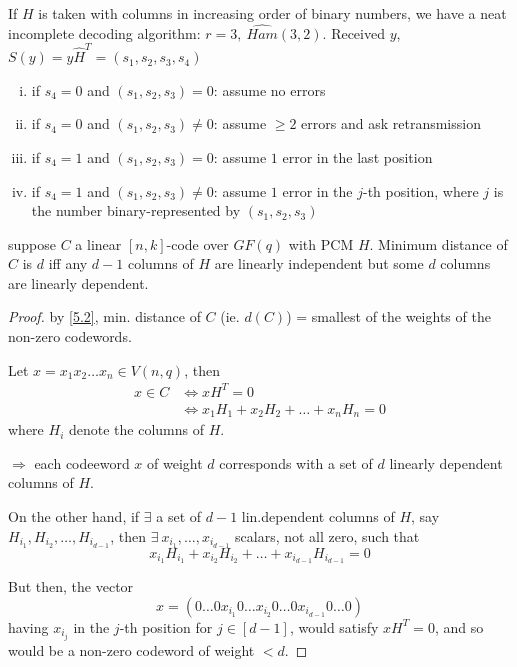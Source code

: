 \documentclass{article}
\theoremstyle{definition}
\newenvironment{thm}[1]
{\renewcommand\theinnerthm{#1}\innerthm}
{\endinnerthm}
\newenvironment{eg}[1]
{\renewcommand\theinnereg{#1}\innereg}
{\endinnereg}
\newcommand{\Vnq}{V(n, q)}
\begin{document}
If $H$ is taken with columns in increasing order of binary numbers, we have a neat incomplete decoding algorithm:
\begin{eg}{8.3}
  $r=3,~ \hat{Ham}(3,2)$. Received $y$, $S(y)=y \hat{H}^T = (s_1, s_2, s_3, s_4)$
  \begin{enumerate}[i.]
    \item if $s_4=0$ and $(s_1,s_2,s_3)=0$: assume no errors
    \item if $s_4=0$ and $(s_1,s_2,s_3) \neq 0$: assume $\geq 2$ errors and ask retransmission
    \item if $s_4=1$ and $(s_1,s_2,s_3)=0$: assume $1$ error in the last position
    \item if $s_4=1$ and $(s_1,s_2,s_3) \neq 0$: assume $1$ error in the $j$-th position, where $j$ is the number binary-represented by $(s_1,s_2,s_3)$
  \end{enumerate}
\end{eg}

\vspace{1.0cm}

\begin{thm}{8.4} \label{8.4}
  suppose $C$ a linear $[n,k]$-code over $GF(q)$ with PCM $H$. Minimum distance of $C$ is $d$ iff any $d-1$ columns of $H$ are linearly independent but some $d$ columns are linearly dependent.
\end{thm}
\begin{proof}
  by \ref{5.2}, min. distance of $C$ (ie. $d(C)$) = smallest of the weights of the non-zero codewords.

  Let $x=x_1 x_2 \ldots x_n \in \Vnq$, then
  \begin{align*}
    x \in C &\Longleftrightarrow xH^T=0\\
            &\Longleftrightarrow x_1 H_1 + x_2 H_2 + \ldots + x_n H_n = 0
  \end{align*}
  where $H_i$ denote the columns of $H$.

  $\Longrightarrow$ each codeeword $x$ of weight $d$ corresponds with a set of $d$ linearly dependent columns of $H$.

  On the other hand, if $\exists$ a set of $d-1$ lin.dependent columns of $H$, say $H_{i_1}, H_{i_2}, \ldots, H_{i_{d-1}}$, then $\exists~ x_{i_1}, \ldots, x_{i_{d-1}}$ scalars, not all zero, such that
  $$x_{i_1} H_{i_1} + x_{i_2} H_{i_2} + \ldots + x_{i_{d-1}} H_{i_{d-1}}= 0$$

  But then, the vector
  $$x = (0 \ldots 0 x_{i_1} 0 \ldots x_{i_2} 0 \ldots 0 x_{i_{d-1}} 0 \ldots 0)$$
  having $x_{i_j}$ in the $j$-th position for $j \in [d-1]$, would satisfy $x H^T=0$, and so would be a non-zero codeword of weight $<d$.
\end{proof}
\end{document}
